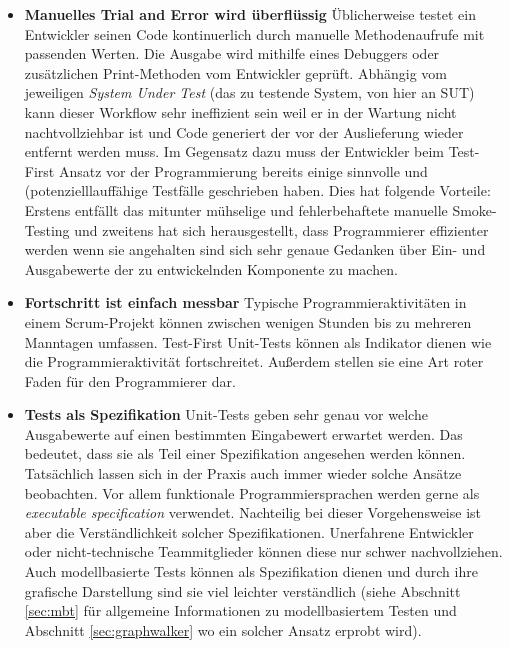 \begin{itemize}
\item \textbf{Manuelles Trial and Error wird überflüssig} Üblicherweise testet ein Entwickler seinen Code kontinuerlich durch manuelle Methodenaufrufe mit passenden Werten. Die Ausgabe wird mithilfe eines Debuggers oder zusätzlichen Print-Methoden vom Entwickler geprüft. Abhängig vom jeweiligen \textit{System Under Test} (das zu testende System, von hier an \gls{SUT}) kann dieser Workflow sehr ineffizient sein weil er in der Wartung nicht nachtvollziehbar ist und Code generiert der vor der Auslieferung wieder entfernt werden muss. Im Gegensatz dazu muss der Entwickler beim Test-First Ansatz vor der Programmierung bereits einige sinnvolle und (potenzielllauffähige Testfälle geschrieben haben. Dies hat folgende Vorteile: Erstens entfällt das mitunter mühselige und fehlerbehaftete manuelle Smoke-Testing und zweitens hat sich herausgestellt, dass Programmierer effizienter werden wenn sie angehalten sind sich sehr genaue Gedanken über Ein- und Ausgabewerte der zu entwickelnden Komponente zu machen\cite{erdogmus_effectiveness_2005}.
\item \textbf{Fortschritt ist einfach messbar} Typische Programmieraktivitäten in einem Scrum-Projekt können zwischen wenigen Stunden bis zu mehreren Manntagen umfassen. Test-First Unit-Tests können als Indikator dienen wie die Programmieraktivität fortschreitet. Außerdem stellen sie eine Art roter Faden für den Programmierer dar.
\item \textbf{Tests als Spezifikation} Unit-Tests geben sehr genau vor welche Ausgabewerte auf einen bestimmten Eingabewert erwartet werden. Das bedeutet, dass sie als Teil einer Spezifikation angesehen werden können. Tatsächlich lassen sich in der Praxis auch immer wieder solche Ansätze beobachten. Vor allem funktionale Programmiersprachen werden gerne als \textit{executable specification} verwendet\cite{klein_sel4:_2010}. Nachteilig bei dieser Vorgehensweise ist aber die Verständlichkeit solcher Spezifikationen. Unerfahrene Entwickler oder nicht-technische Teammitglieder können diese nur schwer nachvollziehen. Auch modellbasierte Tests können als Spezifikation dienen und durch ihre grafische Darstellung sind sie viel leichter verständlich (siehe Abschnitt \ref{sec:mbt} für allgemeine Informationen zu modellbasiertem Testen und Abschnitt \ref{sec:graphwalker} wo ein solcher Ansatz erprobt wird).
\end{itemize}


